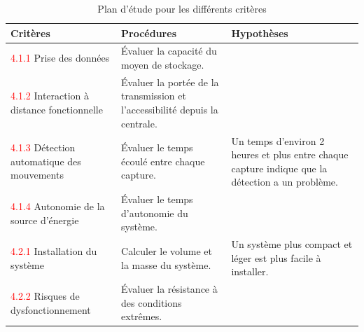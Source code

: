 \begin{table}[H]
  \centering
  \footnotesize
  \begin{tabular}{|p{3.6cm}|p{5.0cm}|p{5.0cm}|}
    \hline
    \textbf{Critères} & \textbf{Procédures} & \textbf{Hypothèses} \\
    \hline
    \textcolor{red}{4.1.1} Prise des données & Évaluer la capacité du moyen de stockage. & \\
    \hline
    \textcolor{red}{4.1.2} Interaction à distance fonctionnelle & Évaluer la portée de la transmission et l’accessibilité depuis la centrale. & \\
    \hline
    \textcolor{red}{4.1.3} Détection automatique des mouvements & Évaluer le temps écoulé entre chaque capture. & Un temps d’environ 2 heures et plus entre chaque capture indique que la détection a un problème. \\
    \hline
    \textcolor{red}{4.1.4} Autonomie de la source d’énergie & Évaluer le temps d’autonomie du système. & \\
    \hline
    \textcolor{red}{4.2.1} Installation du système & Calculer le volume et la masse du système. & Un système plus compact et léger est plus facile à installer. \\
    \hline
    \textcolor{red}{4.2.2} Risques de dysfonctionnement & Évaluer la résistance à des conditions extrêmes. & \\
    \hline
  \end{tabular}
  \caption{Plan d’étude pour les différents critères}
  \label{tab:criteres-detail}
\end{table}

